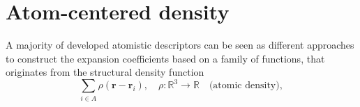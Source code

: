 \section{Atom-centered density}
\label{sec:environment}
A majority of developed atomistic descriptors can be seen as different approaches to construct the expansion coefficients based on a family of functions, that originates from the structural density function~\cite{musil2021physics} 
\begin{equation}
  \label{eq:basis_expansion}
  \sum_{i\in A} \rho(\mathbf{r}-\mathbf{r}_i),\quad \rho:\mathbb{R}^3\rightarrow\mathbb{R}\quad\text{(atomic density)},
\end{equation}
